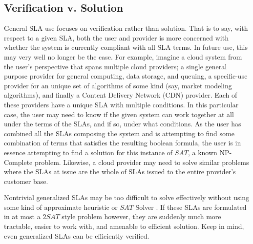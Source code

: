 \subsection{Verification v. Solution}
General SLA use focuses on verification rather than solution.  That is to say, with respect to a given SLA, both the user and provider is more concerned with whether the system is currently compliant with all SLA terms.  In future use, this may very well no longer be the case.  For example, imagine a cloud system from the user's perspective that spans multiple cloud providers; a single general purpose provider for general computing, data storage, and queuing, a specific-use provider for an unique set of algorithms of some kind (say, market modeling algorithms), and finally a Content Delivery Network (CDN) provider.  Each of these providers have a unique SLA with multiple conditions.  In this particular case, the user may need to know if the given system can work together at all under the terms of the SLAs, and if so, under what conditions.  As the user has combined all the SLAs composing the system and is attempting to find some combination of terms that satisfies the resulting boolean formula, the user is in essence attempting to find a solution for this instance of $ SAT $, a known NP-Complete problem.  Likewise, a cloud provider may need to solve similar problems where the SLAs at issue are the whole of SLAs issued to the entire provider's customer base.

Nontrivial generalized SLAs may be too difficult to solve effectively without using some kind of approximate heuristic or $ SAT $ Solver \cite{Hochbaum:1996:AAN:241938,ctrl:satcompetition}.  If these SLAs are formulated in at most a $ 2SAT $ style problem however, they are suddenly much more tractable, easier to work with, and amenable to efficient solution.  Keep in mind, even generalized SLAs can be efficiently verified.
